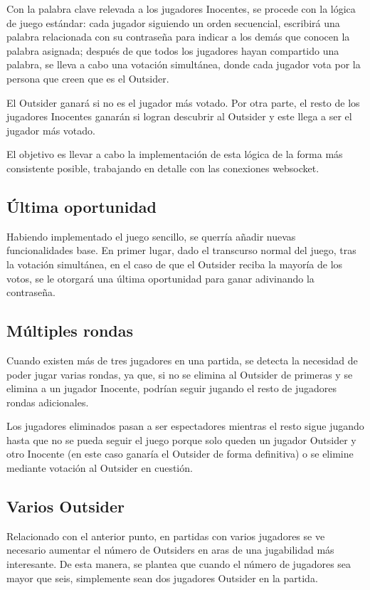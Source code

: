 Con la palabra clave relevada a los jugadores Inocentes, se procede con la lógica de juego estándar: cada jugador siguiendo 
un orden secuencial, escribirá una palabra relacionada con su contraseña
para indicar a los demás que conocen la palabra asignada; después de que todos los jugadores hayan compartido una
palabra, se lleva a cabo una votación simultánea, donde cada jugador vota por la persona que creen
que es el Outsider.

El Outsider ganará si no es el jugador más votado. Por otra parte, el resto de los jugadores Inocentes ganarán
si logran descubrir al Outsider y este llega a ser el jugador más votado.

El objetivo es llevar a cabo la implementación de esta lógica de la forma más consistente posible, trabajando en
detalle con las conexiones websocket.

\subsection{Última oportunidad}

Habiendo implementado el juego sencillo, se querría añadir nuevas funcionalidades base. En primer lugar, dado el transcurso
normal del juego, tras la votación simultánea, en el caso de que el Outsider reciba la mayoría de los votos, se le otorgará
una última oportunidad para ganar adivinando la contraseña.

\subsection{Múltiples rondas}

Cuando existen más de tres jugadores en una partida, se detecta la necesidad de poder jugar varias rondas,
ya que, si no se elimina al Outsider de primeras y se elimina a un jugador Inocente, podrían seguir jugando el resto de jugadores
rondas adicionales.

Los jugadores eliminados pasan a ser espectadores mientras el resto sigue jugando hasta que no 
se pueda seguir el juego porque solo queden un jugador Outsider y otro Inocente (en este caso
ganaría el Outsider de forma definitiva) o se elimine mediante votación al Outsider en cuestión.

\subsection{Varios Outsider}

Relacionado con el anterior punto, en partidas con varios jugadores se ve necesario aumentar el número de Outsiders en aras de
una jugabilidad más interesante. De esta manera, se plantea que cuando el número de jugadores sea mayor que seis, simplemente sean
dos jugadores Outsider en la partida.

